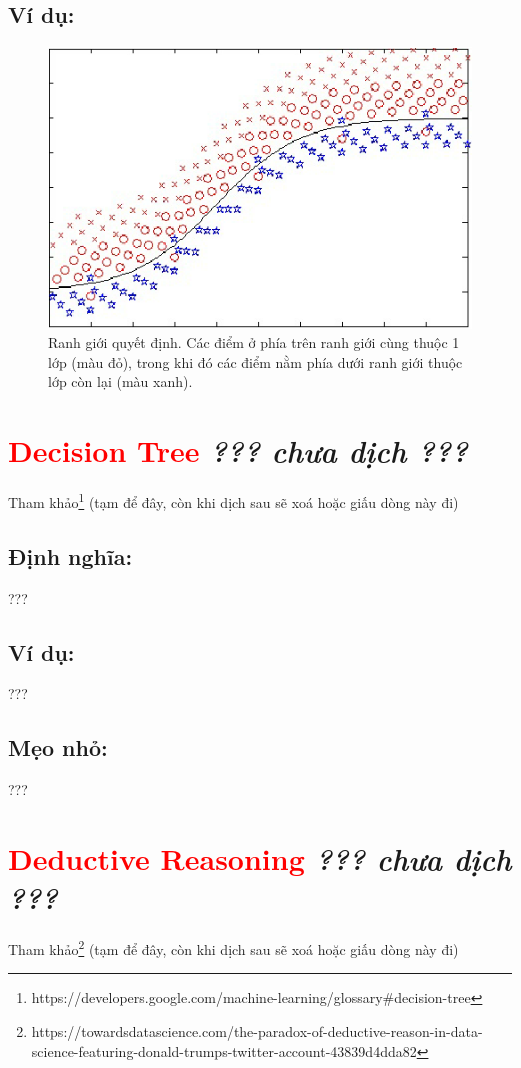 \subsection*{Ví dụ:}
\begin{figure}[!h]
    \centering
    \includegraphics[width=1.0\linewidth]{figures/D_Decision_boundary.png}
    \caption{Ranh giới quyết định. Các điểm ở phía trên ranh giới cùng thuộc 1 lớp (màu đỏ), trong khi đó các điểm nằm phía dưới ranh giới thuộc lớp còn lại (màu xanh).}
    \label{fig:D_Decision_boundary}
\end{figure}
\section*{\huge \textcolor{Red}{Decision Tree}  \small \textit{??? chưa dịch ???} }
Tham khảo\footnote{https://developers.google.com/machine-learning/glossary\#decision-tree} (tạm để đây, còn khi dịch sau sẽ xoá hoặc giấu dòng này đi)
\subsection*{Định nghĩa:}
???
\subsection*{Ví dụ:}
???
\subsection*{Mẹo nhỏ:}
???
\section*{\huge \textcolor{Red}{Deductive Reasoning}  \small \textit{??? chưa dịch ???} }
Tham khảo\footnote{https://towardsdatascience.com/the-paradox-of-deductive-reason-in-data-science-featuring-donald-trumps-twitter-account-43839d4dda82} (tạm để đây, còn khi dịch sau sẽ xoá hoặc giấu dòng này đi)
